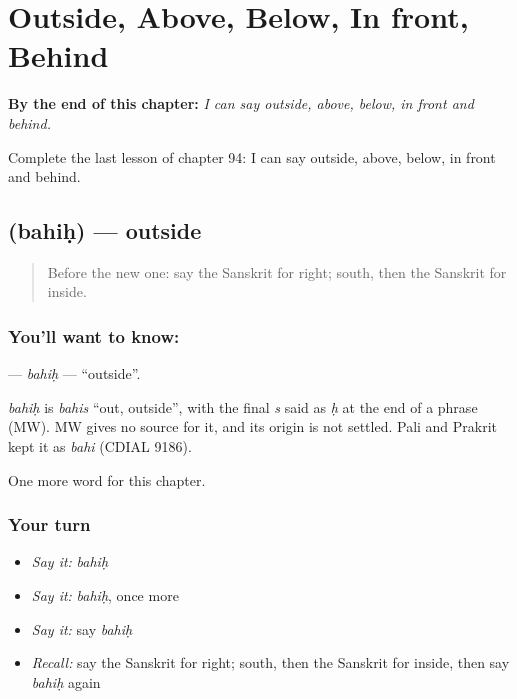 
\chapter{Outside, Above, Below, In front, Behind}
\label{ch:sa-outside-above-below-in-front-behind}

\begin{chapteropening}
\textbf{By the end of this chapter:} \emph{I can say outside, above, below, in front and behind.}

Complete the last lesson of chapter 94: I can say outside, above, below, in front and behind.
\end{chapteropening}

\section[\texorpdfstring{\sk{बहिः} (bahiḥ)}{बहिः (bahiḥ)}]{ (bahiḥ) — outside}

\label{lesson:SA-C94-bahih}



\begin{quote}
Before the new one: say the Sanskrit for right; south, then the Sanskrit for inside.
\end{quote}

\subsection*{You'll want to know: }
\textbf{} — \emph{bahiḥ} — \textquotedblleft{}outside\textquotedblright{}.

\begin{cousinweb}
\emph{bahiḥ} is \emph{bahis} \textquotedblleft{}out, outside\textquotedblright{}, with the final \emph{s} said as \emph{ḥ} at the end of a phrase (MW). MW gives no source for it, and its origin is not settled. Pali and Prakrit kept it as \emph{bahi} (CDIAL 9186).
\end{cousinweb}

\begin{grammarlens}[title={What you've built}]
One more word for this chapter.
\end{grammarlens}

\subsection*{Your turn}
\begin{itemize}
\raggedright
  \item \emph{Say it:} \emph{bahiḥ}
  \item \emph{Say it:} \emph{bahiḥ}, once more
  \item \emph{Say it:} say \emph{bahiḥ}
  \item \emph{Recall:} say the Sanskrit for right; south, then the Sanskrit for inside, then say \emph{bahiḥ} again
\end{itemize}

